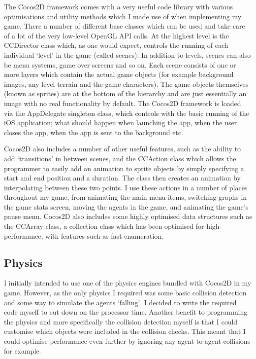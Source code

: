 \documentclass[a4paper,oneside]{report}
\begin{document}
The Cocos2D framework comes with a very useful code library with various optimisations and utility methods which I made use of when implementing my game. There a number of different base classes which can be used and take care of a lot of the very low-level OpenGL API calls. At the highest level is the CCDirector class which, as one would expect, controls the running of each individual `level' in the game (called scenes). In addition to levels, scenes can also be menu systems, game over screens and so on. Each scene consists of one or more layers which contain the actual game objects (for example background images, any level terrain and the game characters). The game objects themselves (known as sprites) are at the bottom of the hierarchy and are just essentially an image with no real functionality by default. The Cocos2D framework is loaded via the AppDelegate singleton class, which controls with the basic running of the iOS application; what should happen when launching the app, when the user closes the app, when the app is sent to the background etc. 

Cocos2D also includes a number of other useful features, such as the ability to add `transitions' in between scenes, and the CCAction class which allows the programmer to easily add an animation to sprite objects by simply specifying a start and end position and a duration. The class then creates an animation by interpolating between these two points. I use these actions in a number of places throughout my game, from animating the main menu items, switching graphs in the game stats screen, moving the agents in the game, and animating the game's pause menu. Cocos2D also includes some highly optimised data structures such as the CCArray class, a collection class which has been optimised for high-performance, with features such as fast enumeration.

\subsection{Physics}

I initially intended to use one of the physics engines bundled with Cocos2D in my game. However, as the only physics I required was some basic collision detection and some way to simulate the agents `falling', I decided to write the required code myself to cut down on the processor time. Another benefit to programming the physics and more specifically the collision detection myself is that I could customise which objects were included in the collision checks. This meant that I could optimise performance even further by ignoring any agent-to-agent collisions for example.
\end{document}
